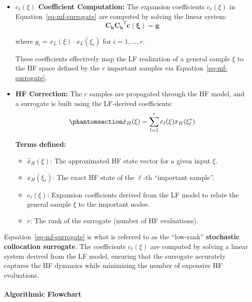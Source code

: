 \documentclass[
  letterpaper,
  DIV=11,
  numbers=noendperiod,
  oneside]{scrartcl}
\makeatletter
\let\oldparagraph\paragraph
\renewcommand{\paragraph}{
    \@ifstar
      \xxxParagraphStar
      \xxxParagraphNoStar
  }
\newcommand{\xxxParagraphStar}[1]{\oldparagraph*{#1}\mbox{}}
\newcommand{\xxxParagraphNoStar}[1]{\oldparagraph{#1}\mbox{}}
\makeatother
\begin{document}
\begin{itemize}
  See Section~\ref{sec-appendix-pivoted-cholesky} for a detailed
  derivation of the pivoted Cholesky algorithm and its application to MF
  uncertainty propagation.
\item
  \textbf{\(c_\ell(\xi)\) Coefficient Computation:} The expansion
  coefficients \(c_\ell(\xi)\) in Equation~\ref{eq-mf-surrogate} are
  computed by solving the linear system: \[
   \mathbf{C_h C_h}^T \mathbf{c}(\mathbf{\xi}) = \mathbf{g}
   \]

  where \(g_i = x_L(\xi) \cdot x_L(\xi_i)\) for \(i = 1, \ldots, r\).

  These coefficients effectively map the LF realization of a general
  sample \(\xi\) to the HF space defined by the \(r\) important samples
  via Equation~\ref{eq-mf-surrogate}.
\item
  \textbf{HF Correction:} The \(r\) samples are propagated through the
  HF model, and a surrogate is built using the LF-derived coefficients:
  \begin{equation}\protect\phantomsection\label{eq-mf-surrogate}{
  \hat{x}_H(\xi) = \sum_{l=1}^r c_\ell(\xi)x_H(\xi_\ell^*)
  }\end{equation}

  \textbf{Terms defined:}

  \begin{itemize}
  \item
    \(\hat{x}_H(\xi)\): The approximated HF state vector for a given
    input \(\xi\).
  \item
    \(x_H(\xi_\ell)\): The exact HF state of the \(\ell\)-th ``important
    sample''.
  \item
    \(c_\ell(\xi)\): Expansion coefficients derived from the LF model to
    relate the general sample \(\xi\) to the important nodes.
  \item
    \(r\): The rank of the surrogate (number of HF evaluations).
  \end{itemize}
\end{itemize}

Equation~\ref{eq-mf-surrogate} is what is referred to as the
``low-rank'' \textbf{stochastic collocation surrogate}. The coefficients
\(c_\ell(\xi)\) are computed by solving a linear system derived from the
LF model, ensuring that the surrogate accurately captures the HF
dynamics while minimizing the number of expensive HF evaluations.

\paragraph{\texorpdfstring{\textbf{Algorithmic
Flowchart}}{Algorithmic Flowchart}}\label{algorithmic-flowchart}
\end{document}
